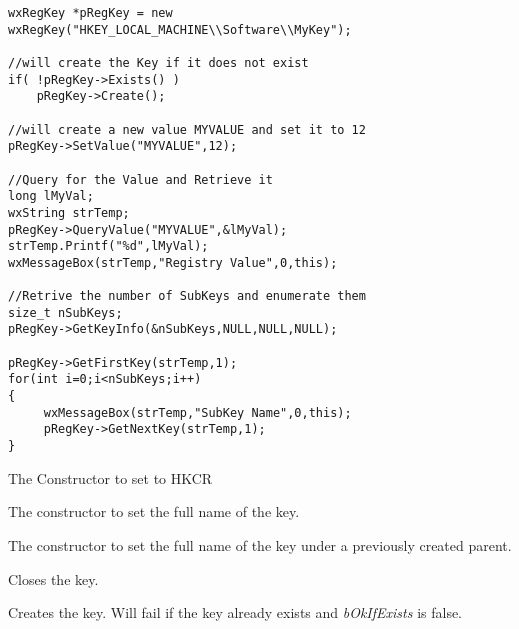 \begin{verbatim}
wxRegKey *pRegKey = new wxRegKey("HKEY_LOCAL_MACHINE\\Software\\MyKey");

//will create the Key if it does not exist
if( !pRegKey->Exists() )
    pRegKey->Create();

//will create a new value MYVALUE and set it to 12
pRegKey->SetValue("MYVALUE",12);

//Query for the Value and Retrieve it
long lMyVal;
wxString strTemp;
pRegKey->QueryValue("MYVALUE",&lMyVal); 
strTemp.Printf("%d",lMyVal);
wxMessageBox(strTemp,"Registry Value",0,this);

//Retrive the number of SubKeys and enumerate them
size_t nSubKeys;
pRegKey->GetKeyInfo(&nSubKeys,NULL,NULL,NULL);

pRegKey->GetFirstKey(strTemp,1);
for(int i=0;i<nSubKeys;i++)
{
     wxMessageBox(strTemp,"SubKey Name",0,this);
     pRegKey->GetNextKey(strTemp,1);
}
\end{verbatim}


\label{wxregkeyctor}


The Constructor to set to HKCR


The constructor to set the full name of the key.


The constructor to set the full name of the key under a previously created parent.

\label{wxregkeyclose}


Closes the key.

\label{wxregkeycreate}


Creates the key. Will fail if the key already exists and {\it bOkIfExists} is false.

\label{wxregkeydeleteself}


